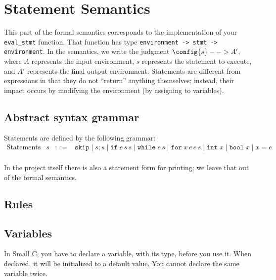 \documentclass[10pt]{article}
\begin{document}
\section{Statement Semantics}

This part of the formal semantics corresponds to the implementation of
your \texttt{eval\_stmt} function. That function has type
\texttt{environment -> stmt -> environment}. In the semantics, we write the
judgment $\config{s} --> A'$, where $A$ represents the input environment, $s$
represents the statement to execute, and $A'$ represents the final output
environment. Statements are different from expressions in that they do
not ``return'' anything themselves; instead, their impact occurs by
modifying the environment (by assigning to variables).

\subsection{Abstract syntax grammar}

Statements are defined by the following grammar:
\[
\begin{array}{lrcl}
\mathrm{Statements} & s & \mathtt{::=} & \mathtt{skip} \mid  s
                                         \mathtt{;} s \mid
                                         \mathtt{if}\;e\,s\,s \mid
                                         \mathtt{while}\;e\,s \mid
                                         \mathtt{for}\;x\,e\,e\,s \mid
                                         \mathtt{int}\;x \mid
                                         \mathtt{bool}\;x \mid
                                         x = e \\
\end{array}
\]

In the project itself there is also a statement form for printing; we
leave that out of the formal semantics.

\subsection{Rules}

\subsection*{Variables}

In Small C, you have to declare a variable, with its type, before you
use it. When declared, it will be initialized to a default value. You
cannot declare the same variable twice.
\end{document}
